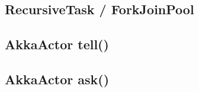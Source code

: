 \newpage
\subsection{RecursiveTask / ForkJoinPool}
\label{javaRunnable}


\subsection{AkkaActor tell()}
\label{javaRunnable}


\newpage
\subsection{AkkaActor ask()}
\label{javaRunnable}

